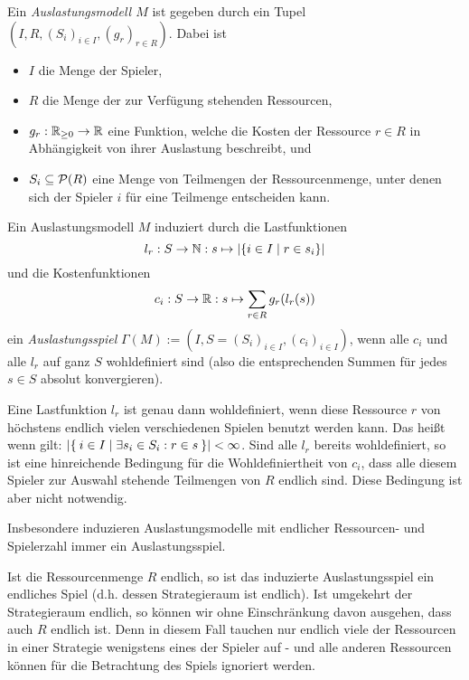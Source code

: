 \begin{defn}\label{def:Auslastungsmodel}
	Ein \emph{Auslastungsmodell $M$} ist gegeben durch ein Tupel $(I, R, (S_i)_{i\in I}, (g_r)_{r \in R})$. Dabei ist
	\begin{itemize}
		\item $I$ die Menge der Spieler,
		\item $R$ die Menge der zur Verfügung stehenden Ressourcen,
		\item $g_r: \mathbb{R}_{\geq 0} \to \mathbb{R}$ eine Funktion, welche die Kosten der Ressource $r \in R$ in Abhängigkeit von ihrer Auslastung beschreibt, und
		\item $S_i \subseteq \mathcal{P}(R)$ eine Menge von Teilmengen der Ressourcenmenge, unter denen sich der Spieler $i$ für eine Teilmenge entscheiden kann. 
	\end{itemize}
\end{defn}

\begin{defn}\label{def:Auslastungsspiel}
	Ein Auslastungsmodell $M$ induziert durch die Lastfunktionen
		\[l_r: S \to \mathbb{N}: s \mapsto \left|\{i\in I \mid r \in s_i\}\right|\]
	und die Kostenfunktionen
		\[c_i: S \to \mathbb{R}: s \mapsto \sum_{r \in R} g_r(l_r(s)) \]
	ein \emph{Auslastungsspiel} $\Gamma(M) := (I, S = (S_i)_{i\in I}, (c_i)_{i \in I})$, wenn alle $c_i$ und alle $l_r$ auf ganz $S$ wohldefiniert sind (also die entsprechenden Summen für jedes $s \in S$ absolut konvergieren).
\end{defn}

\begin{bem}\label{bem:AuslSpielWohldefiniertheit}
	Eine Lastfunktion $l_r$ ist genau dann wohldefiniert, wenn diese Ressource $r$ von höchstens endlich vielen verschiedenen Spielen benutzt werden kann. Das heißt wenn gilt: $\left|\Set{i \in I | \exists s_i \in S_i: r \in s}\right| < \infty$. Sind alle $l_r$ bereits wohldefiniert, so ist eine hinreichende Bedingung für die Wohldefiniertheit von $c_i$, dass alle diesem Spieler zur Auswahl stehende Teilmengen von $R$ endlich sind. Diese Bedingung ist aber nicht notwendig.
	
	Insbesondere induzieren Auslastungsmodelle mit endlicher Ressourcen- und Spielerzahl immer ein Auslastungsspiel.
	
	Ist die Ressourcenmenge $R$ endlich, so ist das induzierte Auslastungsspiel ein endliches Spiel (d.h. dessen Strategieraum ist endlich). Ist umgekehrt der Strategieraum endlich, so können wir ohne Einschränkung davon ausgehen, dass auch $R$ endlich ist. Denn in diesem Fall tauchen nur endlich viele der Ressourcen in einer Strategie wenigstens eines der Spieler auf - und alle anderen Ressourcen können für die Betrachtung des Spiels ignoriert werden.
\end{bem}

